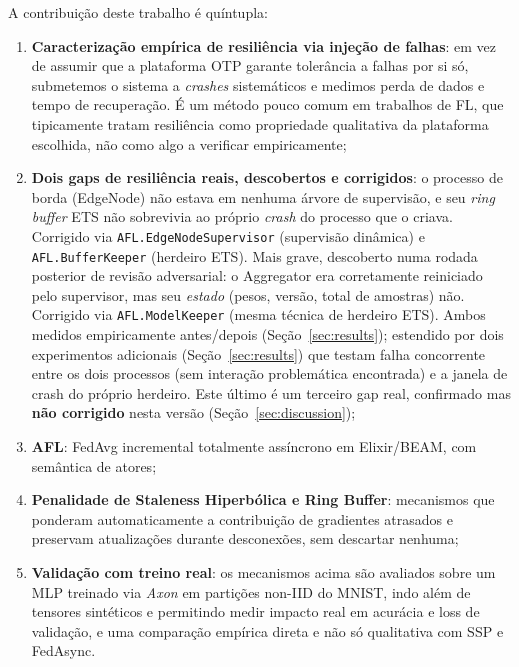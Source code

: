 \documentclass[conference,a4paper]{IEEEtran}
\begin{document}
A contribuição deste trabalho é quíntupla:
\begin{enumerate}[leftmargin=*,noitemsep]
  \item \textbf{Caracterização empírica de resiliência via injeção de falhas}:
        em vez de assumir que a plataforma OTP garante tolerância a falhas
        por si só, submetemos o sistema a \textit{crashes} sistemáticos e
        medimos perda de dados e tempo de recuperação. É um método pouco
        comum em trabalhos de FL, que tipicamente tratam resiliência como
        propriedade qualitativa da plataforma escolhida, não como algo a
        verificar empiricamente;
  \item \textbf{Dois gaps de resiliência reais, descobertos e corrigidos}: o
        processo de borda (EdgeNode) não estava em nenhuma árvore de
        supervisão, e seu \textit{ring buffer} ETS não sobrevivia ao
        próprio \textit{crash} do processo que o criava. Corrigido via
        \texttt{AFL.EdgeNodeSupervisor} (supervisão dinâmica) e
        \texttt{AFL.BufferKeeper} (herdeiro ETS). Mais grave, descoberto
        numa rodada posterior de revisão adversarial: o Aggregator era
        corretamente reiniciado pelo supervisor, mas seu \emph{estado}
        (pesos, versão, total de amostras) não. Corrigido via
        \texttt{AFL.ModelKeeper} (mesma técnica de herdeiro ETS). Ambos
        medidos empiricamente antes/depois (Seção~\ref{sec:results});
        estendido por dois experimentos adicionais (Seção~\ref{sec:results})
        que testam falha concorrente entre os dois processos (sem
        interação problemática encontrada) e a janela de crash do
        próprio herdeiro. Este último é um terceiro gap real, confirmado mas
        \textbf{não corrigido} nesta versão (Seção~\ref{sec:discussion});
  \item \textbf{AFL}: FedAvg incremental totalmente assíncrono em
        Elixir/BEAM, com semântica de atores;
  \item \textbf{Penalidade de Staleness Hiperbólica e Ring Buffer}:
        mecanismos que ponderam automaticamente a contribuição de
        gradientes atrasados e preservam atualizações durante desconexões,
        sem descartar nenhuma;
  \item \textbf{Validação com treino real}: os mecanismos acima são
        avaliados sobre um MLP treinado via \textit{Axon} em partições
        non-IID do MNIST, indo além de tensores sintéticos e
        permitindo medir impacto real em acurácia e loss de validação, e
        uma comparação empírica direta e não só qualitativa com SSP e
        FedAsync.
\end{enumerate}
\end{document}
